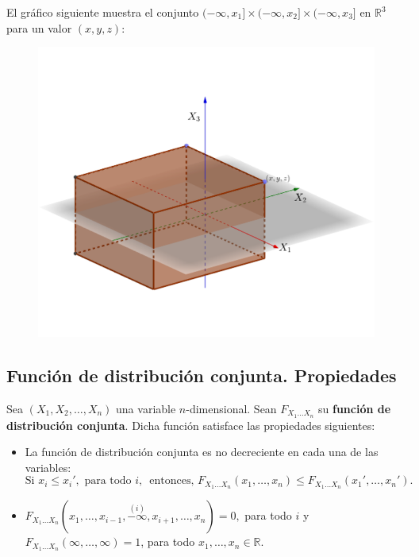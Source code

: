 \documentclass[]{book}
\begin{document}
El gráfico siguiente muestra el conjunto \((-\infty,x_1]\times (-\infty,x_2]\times (-\infty,x_3]\) en \(\mathbb{R}^3\) para un valor \((x,y,z)\):

\begin{figure}
\includegraphics[width=550px]{Images/Fx1x2x3} \end{figure}

\hypertarget{funciuxf3n-de-distribuciuxf3n-conjunta.-propiedades-5}{%
\subsection{Función de distribución conjunta. Propiedades}\label{funciuxf3n-de-distribuciuxf3n-conjunta.-propiedades-5}}

Sea \((X_1,X_2,\ldots,X_n)\) una variable \(n\)-dimensional. Sean \(F_{X_1\ldots X_n}\) su \textbf{función de distribución conjunta}. Dicha función satisface las propiedades siguientes:

\begin{itemize}
\item
  La función de distribución conjunta es no decreciente en cada una de las variables:
  \[
  \mbox{Si }x_i\leq x_i', \mbox{ para todo $i$, }\mbox{ entonces, }F_{X_1\ldots X_n}(x_1,\ldots,x_n)\leq F_{X_1\ldots X_n}(x_1',\ldots,x_n').
  \]
\item
  \(F_{X_1\ldots X_n}(x_1,\ldots,x_{i-1},\stackrel{(i)}{-\infty},x_{i+1},\ldots,x_n)=0,\) para todo \(i\) y \(F_{X_1\ldots X_n}(\infty,\ldots,\infty)=1\), para todo \(x_1,\ldots,x_n\in\mathbb{R}\).
\end{itemize}
\end{document}
